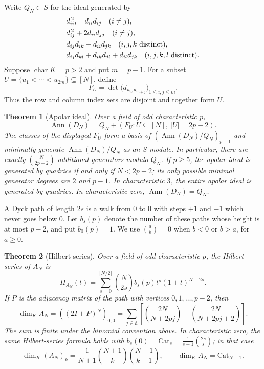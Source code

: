 \documentclass[11pt]{article}
\newtheorem{theorem}{Theorem}[section]
\theoremstyle{definition}
\theoremstyle{remark}
\numberwithin{equation}{section}
\DeclareMathOperator{\Ann}{Ann}
\newcommand{\kk}{K}
\newcommand{\Cat}{\mathrm{Cat}}
\begin{document}
Write $Q_N\subset S$ for the ideal generated by
\begin{align}
 &d_{ii}^{\,2},\quad d_{ii}d_{ij}\quad(i\ne j),\notag\\
 &d_{ij}^{\,2}+2d_{ii}d_{jj}\quad(i\ne j),\notag\\
 &d_{ij}d_{ik}+d_{ii}d_{jk}\quad(i,j,k\text{ distinct}),\notag\\
 &d_{ij}d_{kl}+d_{ik}d_{jl}+d_{il}d_{jk}
       \quad(i,j,k,l\text{ distinct}).\label{eq:quadrics}
\end{align}
Suppose $\operatorname{char}\kk=p>2$ and put $m=p-1$. For a subset
$U=\{u_1<\cdots<u_{2m}\}\subseteq[N]$, define
\begin{equation}\label{eq:generator}
 F_U=\det\bigl(d_{u_i,u_{m+j}}\bigr)_{1\leq i,j\leq m}.
\end{equation}
Thus the row and column index sets are disjoint and together form $U$.

\begin{theorem}[Apolar ideal]\label{thm:ideal}
Over a field of odd characteristic $p$,
\begin{equation}\label{eq:ideal}
 \Ann(D_N)=Q_N+(F_U:U\subseteq[N],\ |U|=2p-2).
\end{equation}
The classes of the displayed $F_U$ form a basis of
$(\Ann(D_N)/Q_N)_{p-1}$ and minimally generate $\Ann(D_N)/Q_N$ as an
$S$-module. In particular, there are exactly $\binom{N}{2p-2}$ additional
generators modulo $Q_N$. If $p\geq5$, the apolar ideal is generated by
quadrics if and only if $N<2p-2$; its only possible minimal generator
degrees are $2$ and $p-1$. In characteristic $3$, the entire apolar ideal
is generated by quadrics. In characteristic zero, $\Ann(D_N)=Q_N$.
\end{theorem}

A Dyck path of length $2s$ is a walk from $0$ to $0$ with steps $+1$ and
$-1$ which never goes below $0$. Let $b_s(p)$ denote the number of these
paths whose height is at most $p-2$, and put $b_0(p)=1$. We use
$\binom{a}{b}=0$ when $b<0$ or $b>a$, for $a\geq0$.

\begin{theorem}[Hilbert series]\label{thm:hilbert}
Over a field of odd characteristic $p$, the Hilbert series of $A_N$ is
\begin{equation}\label{eq:hilbert}
 H_{A_N}(t)=\sum_{s=0}^{\lfloor N/2\rfloor}
       \binom{N}{2s}b_s(p)t^s(1+t)^{N-2s}.
\end{equation}
If $P$ is the adjacency matrix of the path with vertices $0,1,\ldots,p-2$,
then
\begin{equation}\label{eq:length}
 \dim_\kk A_N=((2I+P)^N)_{0,0}
 =\sum_{j\in\mathbb Z}
  \left[\binom{2N}{N+2pj}-\binom{2N}{N+2pj+2}\right].
\end{equation}
The sum is finite under the binomial convention above. In characteristic
zero, the same Hilbert-series formula holds with
$b_s(0)=\Cat_s=\frac{1}{s+1}\binom{2s}{s}$; in that case
\begin{equation}\label{eq:charzero}
 \dim_\kk(A_N)_k=\frac{1}{N+1}\binom{N+1}{k}\binom{N+1}{k+1},
 \qquad \dim_\kk A_N=\Cat_{N+1}.
\end{equation}
\end{theorem}
\end{document}
